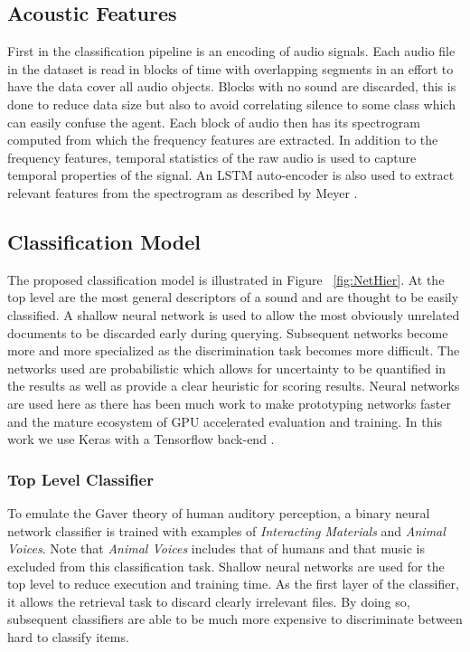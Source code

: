 \subsection{Acoustic Features}
First in the classification pipeline is an encoding of audio signals. Each audio file in the dataset is read in blocks of time with overlapping segments in an effort to have the data cover all audio objects. Blocks with no sound are discarded, this is done to reduce data size but also to avoid correlating silence to some class which can easily confuse the agent. Each block of audio then has its spectrogram computed from which the frequency features are extracted. In addition to the frequency features, temporal statistics of the raw audio is used to capture temporal properties of the signal. An LSTM auto-encoder is also used to extract relevant features from the spectrogram as described by Meyer \cite{Meyer2017}.

\subsection{Classification Model}

The proposed classification model is illustrated in Figure ~\ref{fig:NetHier}. At the top level are the most general descriptors of a sound and are thought to be easily classified. A shallow neural network is used to allow the most obviously unrelated documents to be discarded early during querying. Subsequent networks become more and more specialized as the discrimination task becomes more difficult. The networks used are probabilistic which allows for uncertainty to be quantified in the results as well as provide a clear heuristic for scoring results. Neural networks are used here as there has been much work to make prototyping networks faster and the mature ecosystem of GPU accelerated evaluation and training. In this work we use Keras with a Tensorflow back-end \cite{Abadi2016, chollet2015keras}.

\subsubsection{Top Level Classifier}
To emulate the Gaver theory of human auditory perception, a binary neural network classifier is trained with examples of \textit{Interacting Materials} and \textit{Animal Voices}. Note that \textit{Animal Voices} includes that of humans and that music is excluded from this classification task. Shallow neural networks are used for the top level to reduce execution and training time. As the first layer of the classifier, it allows the retrieval task to discard clearly irrelevant files. By doing so, subsequent classifiers are able to be much more expensive to discriminate between hard to classify items.

